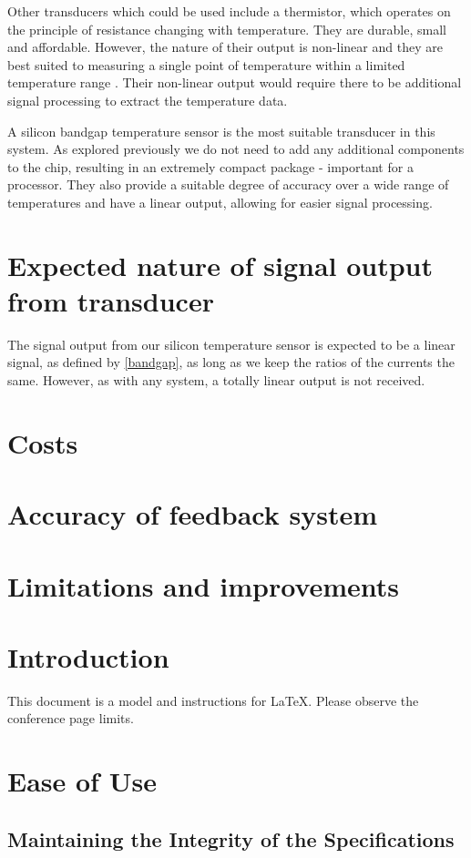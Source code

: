 \documentclass[conference]{IEEEtran}
\begin{document}
Other transducers which could be used include a thermistor, which operates on the principle of resistance changing with temperature. They are durable, small and affordable. However, the nature of their output is non-linear and they are best suited to measuring a single point of temperature within a limited temperature range \cite{b6}. Their non-linear output would require there to be additional signal processing to extract the temperature data. 

A silicon bandgap temperature sensor is the most suitable transducer in this system. As explored previously we do not need to add any additional components to the chip, resulting in an extremely compact package - important for a processor. They also provide a suitable degree of accuracy over a wide range of temperatures and have a linear output, allowing for easier signal processing. 
\section{Expected nature of signal output from transducer}
The signal output from our silicon temperature sensor is expected to be a linear signal, as defined by \eqref{bandgap}, as long as we keep the ratios of the currents the same. However, as with any system, a totally linear output is not received. 
\section{Costs}
\section{Accuracy of feedback system}
\section{Limitations and improvements}

\section{Introduction}
This document is a model and instructions for \LaTeX.
Please observe the conference page limits. 

\section{Ease of Use}

\subsection{Maintaining the Integrity of the Specifications}
\end{document}
